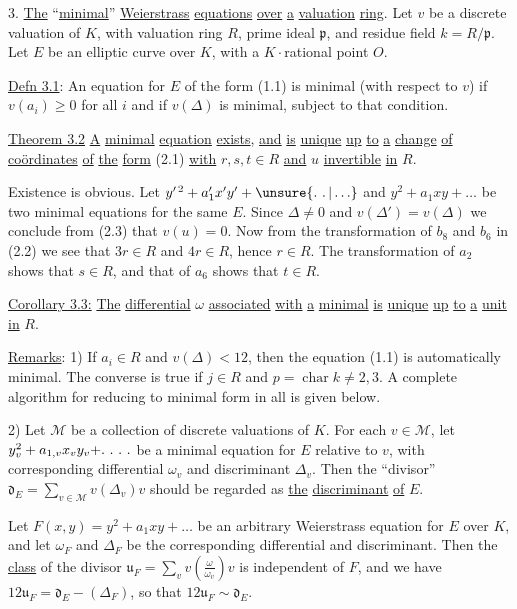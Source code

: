 3. \uline{The} ``\uline{minimal}'' \uline{Weierstrass} \uline{equations} \uline{over} \uline{a} \uline{valuation} \uline{ring}. Let $v$ be a discrete valuation of $K$, with valuation ring $R$, prime ideal $\mathfrak{p}$, and residue field $k=R/\mathfrak{p}$. Let $E$ be an elliptic curve over $K$, with a $K\cdot$rational point $O$.

\uline{Defn 3.1}: An equation for $E$ of the form (1.1) is minimal (with respect to $v$) if $v(a_i)\geqslant0$ for all $i$ and if $v(\Delta)$ is minimal, subject to that condition.

\uline{Theorem 3.2} \uline{A} \uline{minimal} \uline{equation}  \uline{exists}, \uline{and} \uline{is} \uline{unique} \uline{up} \uline{to} \uline{a} \uline{change} \uline{of} \uline{coördinates} \uline{of} \uline{the} \uline{form} (2.1) \uline{with} $r,s,t\in R$ \uline{and} $u$ \uline{invertible} \uline{in} $R$.

Existence is obvious. Let $y^{\prime\,2}+a_1'x'y'+\unsure{\ldotp\,\ldotp|\ldots}$ and $y^2+a_1xy+\ldots$ be two minimal equations for the same $E$. Since $\Delta\ne0$ and $v(\Delta')=v(\Delta)$ we conclude from (2.3) that $v(u)=0$. Now from the transformation of $b_8$ and $b_6$ in (2.2) we see that $3r\in R$ and $4r\in R$, hence $r\in R$.  The transformation of $a_2$ shows that $s\in R$, and that of $a_6$ shows that $t\in R$.

\uline{Corollary 3.3:} \uline{The} \uline{differential} $\omega$ \uline{associated} \uline{with} \uline{a} \uline{minimal}  \uline{is} \uline{unique} \uline{up} \uline{to} \uline{a} \uline{unit} \uline{in} $R$.

\uline{Remarks}: 1) If $a_i\in R$ and $v(\Delta)<12$, then the equation (1.1) is automatically minimal. The converse is true if $j\in R$ and $p=\operatorname{char}k\ne2,3$. A complete algorithm for reducing to minimal form in all  is given below.

2) Let $\mathscr{M}$ be a collection of discrete valuations of $K$. For each $v\in\mathscr{M}$, let $y_v^2+a_{1,v}x_vy_v+\ldotp\,\ldotp\,\ldotp\,\ldotp$ be a minimal equation for $E$ relative to $v$, with corresponding differential $\omega_v$ and discriminant $\Delta_v$. Then the ``divisor'' $\displaystyle \mathfrak{d}_E=\sum_{v\in\mathscr{M}}v(\Delta_v)v$ should be regarded as \uline{the} \uline{discriminant} \uline{of} $E$.

Let $F(x,y)=y^2+a_1xy+\ldots$ be an arbitrary Weierstrass equation for $E$ over $K$, and let $\omega_F$ and $\Delta_F$ be the corresponding differential and discriminant. Then the \uline{class} of the divisor $\displaystyle \mathfrak{u}_F=\sum_v v\left(\frac{\omega}{\omega_v}\right)v$ is independent of $F$, and we have $12\mathfrak{u}_F=\mathfrak{d}_E-(\Delta_F)$, so that $12\mathfrak{u}_F\sim\mathfrak{d}_E$.

